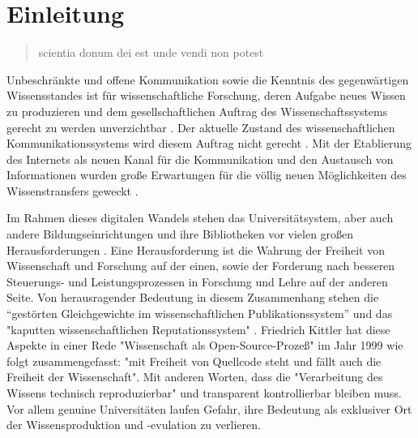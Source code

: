 \chapter{Einleitung} 

\begin{quote}
scientia donum dei est unde vendi non potest
\end{quote}Unbeschränkte und offene Kommunikation sowie die Kenntnis des gegenwärtigen Wissensstandes ist für wissenschaftliche Forschung, deren Aufgabe neues Wissen zu produzieren und dem gesellschaftlichen Auftrag des Wissenschaftssystems gerecht zu werden unverzichtbar \cite{Hanekop_2014} \cite{glaeser2006} \cite{gibbons_1994} \cite{Luhmann1998}. Der aktuelle Zustand des wissenschaftlichen Kommunikationssystems wird diesem Auftrag nicht gerecht \cite{suchen}. Mit der Etablierung des Internets als neuen Kanal für die Kommunikation und den Austausch von Informationen wurden große Erwartungen für die völlig neuen Möglichkeiten des Wissenstransfers geweckt \cite{Hanekop_2014} \cite{schulze_2013_open} \cite{albert_2006_open_implications} \cite{Goodrum_2001} \cite{Lawrence_1999}. 

Im Rahmen dieses digitalen Wandels stehen das Universitätsystem, aber auch andere Bildungseinrichtungen und ihre Bibliotheken vor vielen großen Herausforderungen \cite{Harter2006} \cite{Gu_don_2004} \cite{osterloh2008anreize}. Eine Herausforderung ist die Wahrung der Freiheit von Wissenschaft und Forschung auf der einen,  sowie der Forderung nach besseren Steuerungs- und Leistungsprozessen in Forschung und Lehre \cite{Adler_2009} \cite{gibbons_1994} auf der anderen Seite. Von herausragender Bedeutung in diesem Zusammenhang stehen die “gestörten Gleichgewichte im wissenschaftlichen Publikationssystem” \cite{cite:0} und das "kaputten wissenschaftlichen Reputationssystem" \cite{suchen}. Friedrich Kittler hat diese Aspekte in einer Rede "Wissenschaft als Open-Source-Prozeß" im Jahr 1999 wie folgt zusammengefasst: "mit Freiheit von Quellcode steht und fällt auch die Freiheit der Wissenschaft". Mit anderen Worten, dass die "Verarbeitung des Wissens technisch reproduzierbar" \cite{cite:1} und transparent kontrollierbar \cite{suchen} bleiben muss. Vor allem genuine Universitäten laufen Gefahr, ihre Bedeutung als exklusiver Ort der Wissensproduktion \cite{suchen} und -evulation \cite{suchen} zu verlieren.

